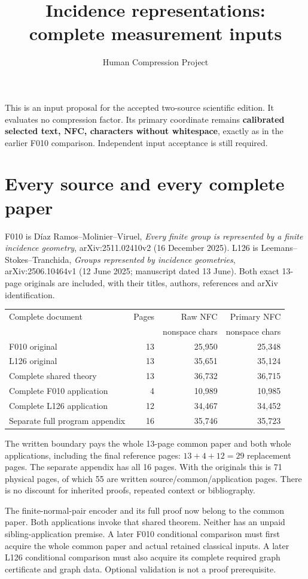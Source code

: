 \documentclass[11pt]{article}
\title{Incidence representations: complete measurement inputs}
\author{Human Compression Project}\date{}
\begin{document}
\maketitle
This is an input proposal for the accepted two-source scientific edition.
It evaluates no compression factor. Its primary coordinate remains
\textbf{calibrated selected text, NFC, characters without whitespace}, exactly
as in the earlier F010 comparison. Independent input acceptance is still required.

\section*{Every source and every complete paper}
F010 is Díaz Ramos--Molinier--Viruel, \emph{Every finite group is represented
by a finite incidence geometry}, arXiv:2511.02410v2 (16 December 2025).
L126 is Leemans--Stokes--Tranchida, \emph{Groups represented by incidence
geometries}, arXiv:2506.10464v1 (12 June 2025; manuscript dated 13 June).
Both exact 13-page originals are included, with their titles, authors,
references and arXiv identification.

\begin{center}\small
\begin{tabular}{lrrr}\toprule
Complete document & Pages & Raw NFC & Primary NFC\\
 & & nonspace chars & nonspace chars\\\midrule
F010 original & 13 & 25,950 & 25,348 \\
L126 original & 13 & 35,651 & 35,124 \\
Complete shared theory & 13 & 36,732 & 36,715 \\
Complete F010 application & 4 & 10,989 & 10,985 \\
Complete L126 application & 12 & 34,467 & 34,452 \\
Separate full program appendix & 16 & 35,746 & 35,723 \\
\bottomrule\end{tabular}\end{center}

The written boundary pays the whole 13-page common paper and both whole
applications, including the final reference pages: $13+4+12=29$ replacement
pages. The separate appendix has all 16 pages. With the originals this is
71 physical pages, of which 55 are written source/common/application pages.
There is no discount for inherited proofs, repeated context or bibliography.

The finite-normal-pair encoder and its full proof now belong to the common
paper. Both applications invoke that shared theorem. Neither has an unpaid
sibling-application premise. A later F010 conditional comparison must first
acquire the whole common paper and actual retained classical inputs. A later
L126 conditional comparison must also acquire its complete required graph
certificate and graph data. Optional validation is not a proof prerequisite.
\end{document}
